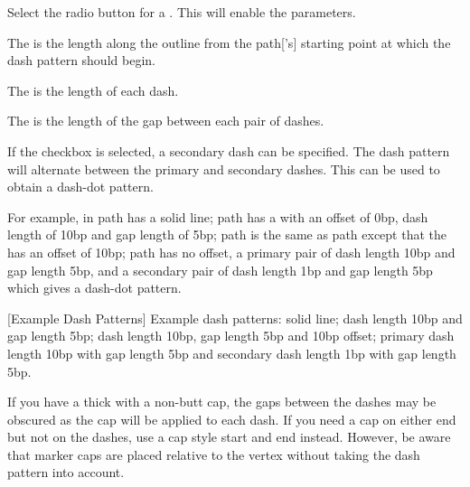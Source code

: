 
Select the  radio button for a
. This will enable the 
parameters.


The  is the length along the outline from the
\gls{path}['s] starting point at which the dash pattern should begin.


The  is the length of each dash.


The  is the length of the gap between
each pair of dashes.


If the  checkbox is selected, 
a secondary dash can be specified. The dash pattern will alternate
between the primary and secondary dashes. This can be used to obtain
a dash-dot pattern.

For example, in  path  has a
solid line; path  has a  with
an offset of 0\gls{bp}, dash length of 10\gls{bp} and gap length of
5\gls{bp}; path  is the same as path
 except that the  has an
offset of 10\gls{bp}; path  has no offset, a primary
pair of dash length 10\gls{bp} and gap length 5\gls{bp}, and a
secondary pair of dash length 1\gls{bp} and gap length 5\gls{bp}
which gives a dash-dot pattern.

{}
[Example Dash Patterns]
{Example dash patterns: 
solid line;  dash length 10bp and gap length 5bp;
 dash length 10bp, gap length 5bp and 10bp offset;
 primary dash length 10bp with gap length 5bp and
secondary dash length 1bp with gap length 5bp.}

\begin{information}
If you have a thick  with a non-butt cap, the
gaps between the dashes may be obscured as the cap will be applied
to each dash. If you need a cap on either end but not on the dashes,
use a cap style start and end  instead.
However, be aware that marker caps are placed relative to the vertex
without taking the dash pattern into account.
\end{information}

